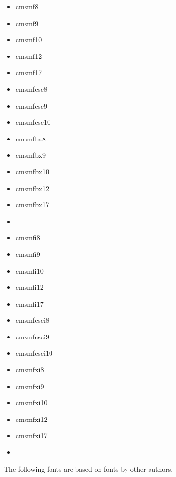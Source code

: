 \documentclass{amsart}
\begin{document}

\noindent\parbox[t]{0.25\textwidth}{
\begin{itemize}
\item \textsf{cmsmf8}
\item \textsf{cmsmf9}
\item \textsf{cmsmf10}
\item \textsf{cmsmf12}
\item \textsf{cmsmf17}
\item \textsf{cmsmfcsc8}
\item \textsf{cmsmfcsc9}
\item \textsf{cmsmfcsc10}
\end{itemize}}\parbox[t]{0.25\textwidth}{\begin{itemize}
\item \textsf{cmsmfbx8}
\item \textsf{cmsmfbx9}
\item \textsf{cmsmfbx10}
\item \textsf{cmsmfbx12}
\item \textsf{cmsmfbx17}
\item \noindent{}
\end{itemize}}\parbox[t]{0.25\textwidth}{\begin{itemize}
\item \textsf{cmsmfi8}
\item \textsf{cmsmfi9}
\item \textsf{cmsmfi10}
\item \textsf{cmsmfi12}
\item \textsf{cmsmfi17}
\item \textsf{cmsmfcsci8}
\item \textsf{cmsmfcsci9}
\item \textsf{cmsmfcsci10}
\end{itemize}}\parbox[t]{0.25\textwidth}{\begin{itemize}
\item \textsf{cmsmfxi8}
\item \textsf{cmsmfxi9}
\item \textsf{cmsmfxi10}
\item \textsf{cmsmfxi12}
\item \textsf{cmsmfxi17}
\item \noindent{}
\end{itemize}}


\bigskip


The following fonts are based on fonts by other authors.
\end{document}
